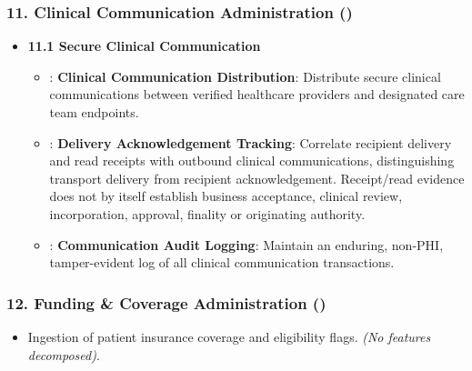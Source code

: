 \subsubsection*{11. Clinical Communication Administration (\texttt{})}
\label{rad:enabling:338}

\begin{itemize}

\item 
\textbf{11.1 Secure Clinical Communication}


\begin{itemize}

\item 
\texttt{}: \textbf{Clinical Communication Distribution}: Distribute secure clinical communications between verified healthcare providers and designated care team endpoints.



\item 
\texttt{}: \textbf{Delivery Acknowledgement Tracking}: Correlate recipient delivery and read receipts with outbound clinical communications, distinguishing transport delivery from recipient acknowledgement. Receipt/\allowbreak{}read evidence does not by itself establish business acceptance, clinical review, incorporation, approval, finality or originating authority.



\item 
\texttt{}: \textbf{Communication Audit Logging}: Maintain an enduring, non-PHI, tamper-evident log of all clinical communication transactions.



\end{itemize}


\end{itemize}
\label{rad:enabling:343}
\subsubsection*{12. Funding \& Coverage Administration (\texttt{})}
\label{rad:enabling:344}

\begin{itemize}

\item 
Ingestion of patient insurance coverage and eligibility flags. \emph{(No features decomposed)}.



\end{itemize}
\label{rad:enabling:346}
